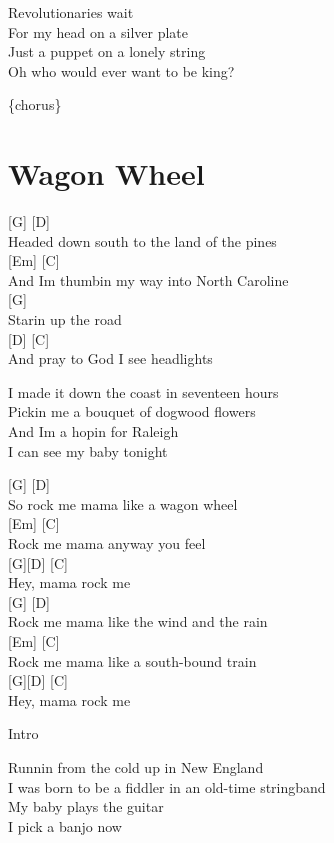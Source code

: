 \documentclass[
  letterpaper,
]{scrbook}
\begin{document}
Revolutionaries wait\\
For my head on a silver plate\\
Just a puppet on a lonely string\\
Oh who would ever want to be king?

\{chorus\}

\hypertarget{wagon-wheel}{%
\chapter{Wagon Wheel}\label{wagon-wheel}}

{[}G{]} {[}D{]}\\
Headed down south to the land of the pines\\
{[}Em{]} {[}C{]}\\
And I\textquotesingle m thumbin\textquotesingle{} my way into North
Caroline\\
{[}G{]}\\
Starin\textquotesingle{} up the road\\
{[}D{]} {[}C{]}\\
And pray to God I see headlights

I made it down the coast in seventeen hours\\
Pickin\textquotesingle{} me a bouquet of dogwood flowers\\
And I\textquotesingle m a hopin\textquotesingle{} for Raleigh\\
I can see my baby tonight

{[}G{]} {[}D{]}\\
So rock me mama like a wagon wheel\\
{[}Em{]} {[}C{]}\\
Rock me mama anyway you feel\\
{[}G{]}{[}D{]} {[}C{]}\\
Hey, mama rock me\\
{[}G{]} {[}D{]}\\
Rock me mama like the wind and the rain\\
{[}Em{]} {[}C{]}\\
Rock me mama like a south-bound train\\
{[}G{]}{[}D{]} {[}C{]}\\
Hey, mama rock me

Intro

Runnin\textquotesingle{} from the cold up in New England\\
I was born to be a fiddler in an old-time stringband\\
My baby plays the guitar\\
I pick a banjo now
\end{document}
